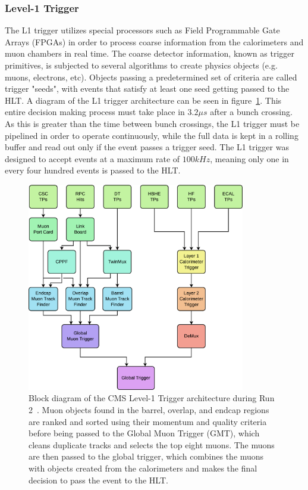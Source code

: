 \subsubsection{Level-1 Trigger} \label{sec:CMS_L1T}
The L1 trigger utilizes special processors such as Field Programmable Gate Arrays (FPGAs) in order to process coarse information from the calorimeters and muon chambers in real time. The coarse detector information, known as trigger primitives, is subjected to several algorithms to create physics objects (e.g. muons, electrons, etc). Objects passing a predetermined set of criteria are called trigger "seeds", with events that satisfy at least one seed getting passed to the HLT. A diagram of the L1 trigger architecture can be seen in figure~\ref{fig:L1T}. This entire decision making process must take place in $3.2\unit{\mu s}$ after a bunch crossing. As this is greater than the time between bunch crossings, the L1 trigger must be pipelined in order to operate continuously, while the full data is kept in a rolling buffer and read out only if the event passes a trigger seed. The L1 trigger was designed to accept events at a maximum rate of $100\unit{kHz}$, meaning only one in every four hundred events is passed to the HLT.

\begin{figure}[htpb]
	\centering
	\includegraphics[width=0.85\textwidth]{figs/03_experiment/cms_l1t.png}
	\caption[CMS Level-1 Trigger architecture during Run 2~\cite{Sirunyan:2721198}]
	{Block diagram of the CMS Level-1 Trigger architecture during Run 2~\cite{Sirunyan:2721198}. Muon objects found in the barrel, overlap, and endcap regions are ranked and sorted using their momentum and quality criteria before being passed to the Global Muon Trigger (GMT), which cleans duplicate tracks and selects the top eight muons. The muons are then passed to the global trigger, which combines the muons with objects created from the calorimeters and makes the final decision to pass the event to the HLT.}
	\label{fig:L1T}
\end{figure}

